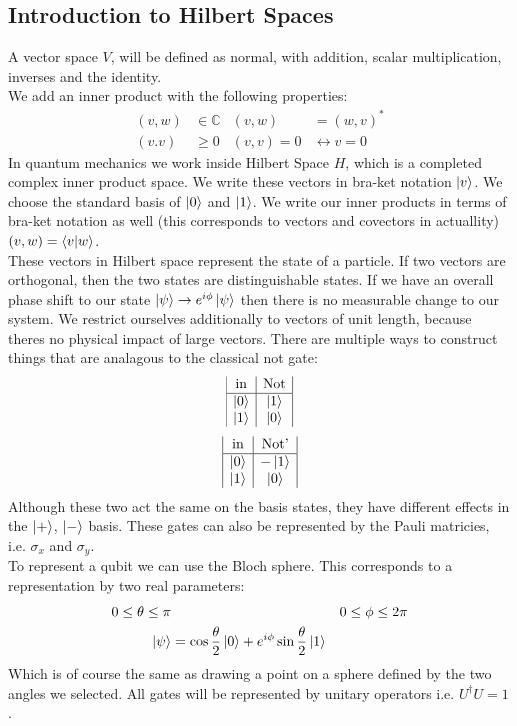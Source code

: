 \subsection{Introduction to Hilbert Spaces}
A vector space $V$, will be defined as normal, with addition, scalar multiplication, inverses and the identity.\\
We add an inner product with the following properties:
\begin{align*}
	(v,w) &\in \mathbb{C} &
	(v,w) &= (w,v)^* \\
	(v.v) &\geq 0 &
	(v,v) = 0 &\leftrightarrow v = 0
\end{align*}
In quantum mechanics we work inside Hilbert Space $H$, which is a completed complex inner product space. We write these vectors in bra-ket notation $\ket{v}$. We choose the standard basis of $\ket{0}$ and $\ket{1}$. We write our inner products in terms of bra-ket notation as well (this corresponds to vectors and covectors in actuallity) $(v,w) = \bra{v}\ket{w}$. \\
These vectors in Hilbert space represent the state of a particle. If two vectors are orthogonal, then the two states are distinguishable states. If we have an overall phase shift to our state $\ket{\psi} \to e^{i\phi}\ket{\psi}$ then there is no measurable change to our system. We restrict ourselves additionally to vectors of unit length, because theres no physical impact of large vectors. There are multiple ways to construct things that are analagous to the classical not gate:
\begin{displaymath}
\begin{array}{|c | c|}
	\text{in} & \text{Not} \\
	\hline
	\ket{0} & \ket{1} \\
	\ket{1} & \ket{0}
\end{array}
\end{displaymath}
\begin{displaymath}
\begin{array}{|c | c|}
	\text{in} & \text{Not'} \\
	\hline
	\ket{0} & -\ket{1} \\
	\ket{1} & \ket{0}
\end{array}
\end{displaymath}
Although these two act the same on the basis states, they have different effects in the $\ket{+}$, $\ket{-}$ basis. These gates can also be represented by the Pauli matricies, i.e. $\sigma_x$ and $\sigma_y$.\\
To represent a qubit we can use the Bloch sphere. This corresponds to a representation by two real parameters:
\begin{align*}
	0 \leq \theta \leq \pi && 0 \leq \phi \leq 2\pi \\
	\ket{\psi} &= \cos \frac{\theta}{2} \ket{0} + e^{i\phi} \sin\frac{\theta}{2} \ket{1}
\end{align*}
Which is of course the same as drawing a point on a sphere defined by the two angles we selected. All gates will be represented by unitary operators i.e. $U^\dagger U = 1$.
